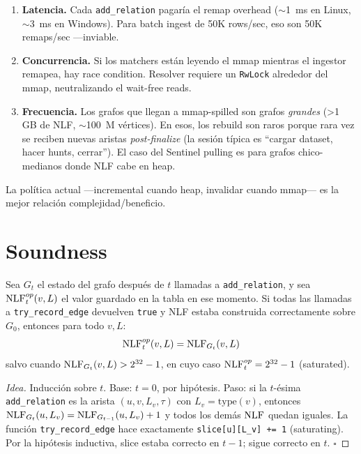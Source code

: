 \begin{enumerate}
    \item \textbf{Latencia.} Cada \texttt{add\_relation} pagaría
    el remap overhead ($\sim$1~ms en Linux, $\sim$3~ms en Windows).
    Para batch ingest de 50K rows/sec, eso son 50K remaps/sec
    ---inviable.
    \item \textbf{Concurrencia.} Si los matchers están leyendo el
    mmap mientras el ingestor remapea, hay race condition. Resolver
    requiere un \texttt{RwLock} alrededor del mmap, neutralizando
    el wait-free reads.
    \item \textbf{Frecuencia.} Los grafos que llegan a mmap-spilled
    son grafos \emph{grandes} (>1 GB de NLF, $\sim$100~M
    vértices). En esos, los rebuild son raros porque rara vez se
    reciben nuevas aristas \emph{post-finalize} (la sesión típica
    es ``cargar dataset, hacer hunts, cerrar''). El caso del
    Sentinel pulling es para grafos chico-medianos donde NLF cabe
    en heap.
\end{enumerate}

\noindent
La política actual ---incremental cuando heap, invalidar cuando
mmap--- es la mejor relación complejidad/beneficio.

\section{Soundness}

\begin{theorem}
Sea \(G_t\) el estado del grafo después de \(t\) llamadas a
\texttt{add\_relation}, y sea \(\mathrm{NLF}^{op}_t(v, L)\) el valor
guardado en la tabla en ese momento. Si todas las llamadas a
\texttt{try\_record\_edge} devuelven \texttt{true} y NLF estaba
construida correctamente sobre \(G_0\), entonces para todo \(v, L\):
\[
\mathrm{NLF}^{op}_t(v, L) = \mathrm{NLF}_{G_t}(v, L)
\]
salvo cuando \(\mathrm{NLF}_{G_t}(v, L) > 2^{32}-1\), en cuyo caso
\(\mathrm{NLF}^{op}_t = 2^{32}-1\) (saturated).
\end{theorem}

\begin{proof}[Idea]
Inducción sobre \(t\). Base: \(t = 0\), por hipótesis.
Paso: si la \(t\)-ésima \texttt{add\_relation} es la arista
\((u, v, L_v, \tau)\) con \(L_v = \mathrm{type}(v)\), entonces
\(\mathrm{NLF}_{G_t}(u, L_v) = \mathrm{NLF}_{G_{t-1}}(u, L_v) + 1\) y todos los
demás \(\mathrm{NLF}\) quedan iguales. La función \texttt{try\_record\_edge}
hace exactamente \texttt{slice[u][L\_v] += 1} (saturating). Por la
hipótesis inductiva, slice estaba correcto en \(t-1\); sigue
correcto en \(t\). \(\square\)
\end{proof}

